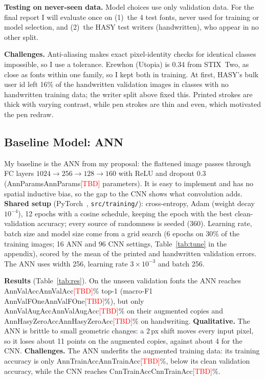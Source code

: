 \documentclass[final]{article}
\newcommand{\TBD}[1][]{\textcolor{red}{[TBD#1]}}
\newcommand{\res}[1]{\ifcsname #1\endcsname\csname #1\endcsname\else\TBD\fi}
\begin{document}
\textbf{Testing on never-seen data.} Model choices use only validation data. For the final report I will
evaluate once on (1)~the 4 test fonts, never used for training or model selection, and (2)~the HASY test
writers (handwritten), who appear in no other split.

\textbf{Challenges.} Anti-aliasing makes exact pixel-identity checks for identical classes impossible, so I
use a tolerance. Erewhon (Utopia) is 0.34 from STIX~Two, as close as fonts within one family, so I kept
both in training. At first, HASY's bulk user id left 16\% of the handwritten validation images in classes
with no handwritten training data; the writer split above fixed this. Printed strokes are thick with varying contrast, while
pen strokes are thin and even, which motivated the pen redraw.

\subsection{Baseline Model: ANN}
\vspace{-0.05in}

My baseline is the ANN from my proposal: the flattened image passes through FC layers
$1024{\to}256{\to}128{\to}160$ with ReLU and dropout 0.3 (\res{AnnParams} parameters). It is easy to
implement and has no spatial inductive bias, so the gap to the CNN shows what convolution adds.
\textbf{Shared setup} (PyTorch~\cite{pytorch}, \texttt{src/training/}): cross-entropy, Adam (weight decay
$10^{-4}$), 12 epochs with a cosine schedule, keeping the epoch with the best clean-validation
accuracy; every source of randomness is seeded (360). Learning rate, batch size and model size come from a
grid search (6 epochs on 30\% of the training images; 16 ANN and 96 CNN settings, Table~\ref{tab:tune} in
the appendix), scored by the mean of the printed and handwritten validation errors. The ANN uses width
256, learning rate $3{\times}10^{-3}$ and batch 256.

\textbf{Results} (Table~\ref{tab:res}). On the unseen validation fonts the ANN reaches \res{AnnValAcc}\%
top-1 (macro-F1 \res{AnnValFOne}\%), but only \res{AnnValAugAcc}\% on their augmented copies and
\res{AnnHasyZeroAcc}\% on handwriting. \textbf{Qualitative.} The ANN is brittle to small geometric changes: a 2\,px
shift moves every input pixel, so it loses about 11 points on the augmented copies, against about 4 for the
CNN. \textbf{Challenges.} The ANN underfits the augmented training data: its training accuracy is only
\res{AnnTrainAcc}\%, below its clean validation accuracy, while the CNN reaches \res{CnnTrainAcc}\%.
\end{document}
